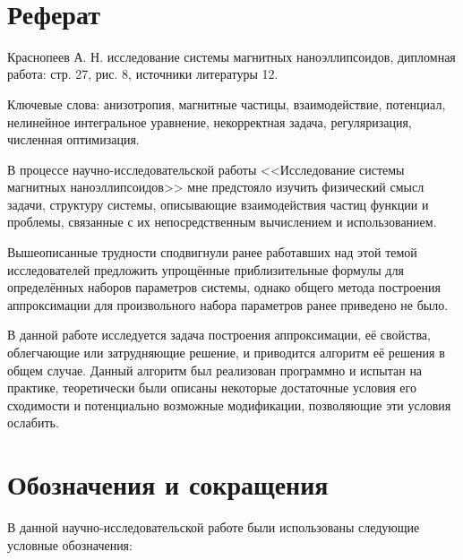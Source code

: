 \documentclass[a4paper,14pt]{extarticle}
\begin{document}

    \

    \newpage


    \section*{Реферат}

    Краснопеев А. Н. исследование системы магнитных наноэллипсоидов,
    дипломная работа: стр. 27, рис. 8, источники
    литературы 12.

    Ключевые слова: анизотропия, магнитные частицы,
    взаимодействие, потенциал, нелинейное интегральное уравнение,
    некорректная задача, регуляризация, численная оптимизация.

    В процессе научно-исследовательской работы
    <<Исследование системы магнитных наноэллипсоидов>>
    мне предстояло изучить физический смысл задачи, структуру системы,
    описывающие взаимодействия частиц функции и проблемы, связанные с их
    непосредственным вычислением и использованием.

    Вышеописанные трудности сподвигнули ранее работавших над этой темой
    исследователей предложить упрощённые приблизительные формулы для
    определённых наборов параметров системы, однако общего метода
    построения аппроксимации для произвольного набора параметров ранее
    приведено не было.

    В данной работе исследуется задача построения аппроксимации,
    её свойства, облегчающие или затрудняющие решение, и приводится алгоритм
    её решения в общем случае.
    Данный алгоритм был реализован программно и испытан на практике,
    теоретически были описаны некоторые достаточные условия его сходимости
    и потенциально возможные модификации, позволяющие эти условия ослабить.

    \newpage

    \tableofcontents

    \newpage

    \section*{Обозначения и сокращения}

    В данной научно-исследовательской работе были использованы следующие
    условные обозначения:
\end{document}
